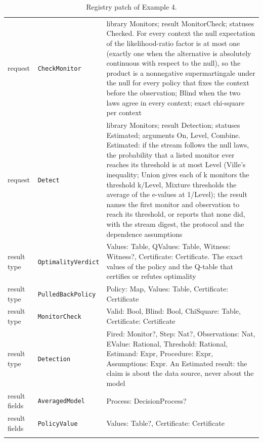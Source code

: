 \documentclass[11pt]{article}
\newcommand{\code}[1]{\texttt{#1}}
\theoremstyle{definition}
\theoremstyle{plain}
\begin{document}
\begin{footnotesize}
\begin{longtable}{>{\raggedright\arraybackslash}p{2.2cm}>{\raggedright\arraybackslash}p{4.1cm}>{\raggedright\arraybackslash}p{7.9cm}}
request & \code{CheckMonitor} & library Monitors; result MonitorCheck; statuses Checked. For every context the null expectation of the likelihood-ratio factor is at most one (exactly one when the alternative is absolutely continuous with respect to the null), so the product is a nonnegative supermartingale under the null for every policy that fixes the context before the observation; Blind when the two laws agree in every context; exact chi-square per context\\
request & \code{Detect} & library Monitors; result Detection; statuses Estimated; arguments On, Level, Combine. Estimated:\allowbreak{} if the stream follows the null laws, the probability that a listed monitor ever reaches its threshold is at most Level (Ville's inequality; Union gives each of k monitors the threshold k/Level, Mixture thresholds the average of the e-values at 1/Level); the result names the first monitor and observation to reach its threshold, or reports that none did, with the stream digest, the protocol and the dependence assumptions\\
result type & \code{OptimalityVerdict} & Values:\allowbreak{} Table, QValues:\allowbreak{} Table, Witness:\allowbreak{} Witness?, Certificate:\allowbreak{} Certificate. The exact values of the policy and the Q-table that certifies or refutes optimality\\
result type & \code{PulledBackPolicy} & Policy:\allowbreak{} Map, Values:\allowbreak{} Table, Certificate:\allowbreak{} Certificate\\
result type & \code{MonitorCheck} & Valid:\allowbreak{} Bool, Blind:\allowbreak{} Bool, ChiSquare:\allowbreak{} Table, Certificate:\allowbreak{} Certificate\\
result type & \code{Detection} & Fired:\allowbreak{} Monitor?, Step:\allowbreak{} Nat?, Observations:\allowbreak{} Nat, EValue:\allowbreak{} Rational, Threshold:\allowbreak{} Rational, Estimand:\allowbreak{} Expr, Procedure:\allowbreak{} Expr, Assumptions:\allowbreak{} Expr. An Estimated result:\allowbreak{} the claim is about the data source, never about the model\\
result fields & \code{AveragedModel} & Process:\allowbreak{} DecisionProcess?\\
result fields & \code{PolicyValue} & Values:\allowbreak{} Table?, Certificate:\allowbreak{} Certificate\\
\bottomrule
\caption{Registry patch of Example 4.}
\end{longtable}
\end{footnotesize}
\end{document}
